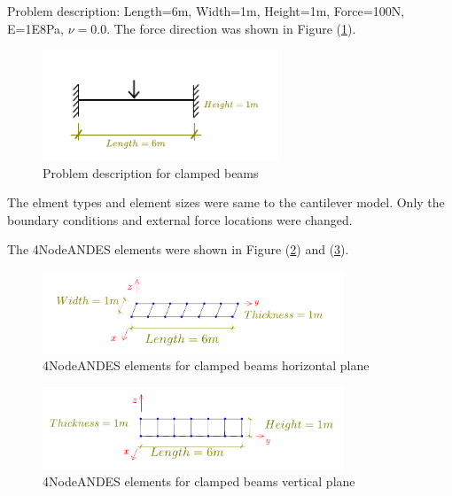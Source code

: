 \documentclass[fleqn,11pt,letter]{article}
\begin{document}
Problem description: Length=6m, Width=1m, Height=1m, Force=100N, E=1E8Pa, $\nu=0.0$. The force direction was shown in Figure (\ref{fig Problem description for clamped beams 4}). 

\begin{figure}[H]
  \centering
  \includegraphics[width=7cm]{../Figure_files/4NodeANDES/clamped_beam.pdf}
  \caption{Problem description for clamped beams}
  \label{fig Problem description for clamped beams 4}
\end{figure}




The elment types and element sizes were same to the cantilever model. Only the boundary conditions and external force locations were changed. 

The 4NodeANDES elements were shown in Figure (\ref{fig 4NodeANDES elements for clamped beams}) and (\ref{fig 4NodeANDES elements for clamped beams 2}).

\begin{figure}[H]
  \centering
  \includegraphics[width=9cm]{../Figure_files/4NodeANDES/beam_ANDES_xy_bending.pdf}
    \captionsetup{justification=centering,margin=4cm}
  \caption{4NodeANDES elements for clamped beams horizontal plane}
  \label{fig 4NodeANDES elements for clamped beams}
\end{figure}


\begin{figure}[H]
  \centering
  \includegraphics[width=9cm]{../Figure_files/4NodeANDES/beam_ANDES_yz_inPlane.pdf}
    \captionsetup{justification=centering,margin=4cm}
  \caption{4NodeANDES elements for clamped beams vertical plane}
  \label{fig 4NodeANDES elements for clamped beams 2}
\end{figure}
\end{document}
